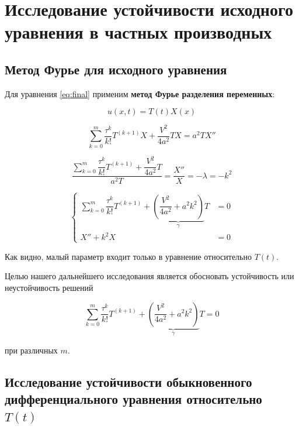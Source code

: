 \section{Исследование устойчивости исходного уравнения в частных производных}

\subsection{Метод Фурье для исходного уравнения}

Для уравнения \ref{eq:final} применим \textbf{метод Фурье разделения переменных}:

\begin{equation*}
u(x,t) = T(t) X(x)
\end{equation*}

\begin{equation*}
\sum\limits_{k=0}^{m} \dfrac{\tau^k}{k!} T^{(k+1)} X + \dfrac{V^2}{4a^2} T X =a^2 T X''
\end{equation*}

\begin{equation*}
\dfrac{\sum\limits_{k=0}^{m} \dfrac{\tau^k}{k!} T^{(k+1)} + \dfrac{V^2}{4a^2} T}{a^2 T} = \dfrac{X''}{X} = -\lambda = -k^2
\end{equation*}

\begin{equation}
\left\{
\begin{aligned}
\sum\limits_{k=0}^{m} \dfrac{\tau^k}{k!} T^{(k+1)} + \underbrace{ \left( \dfrac{V^2}{4a^2} + a^2 k^2 \right)}_{\gamma} T & = 0\\
X'' + k^2 X & = 0
\end{aligned}
\right.
\end{equation}

Как видно, малый параметр входит только в уравнение относительно $T(t)$.

Целью нашего дальнейшего исследования является обосновать устойчивость или неустойчивость решений 

\begin{equation*}
\sum\limits_{k=0}^{m} \dfrac{\tau^k}{k!} T^{(k+1)} + \underbrace{ \left( \dfrac{V^2}{4a^2} + a^2 k^2 \right)}_{\gamma} T = 0
\end{equation*}

при различных $m$.

\subsection{Исследование устойчивости обыкновенного дифференциального уравнения относительно $T(t)$}

